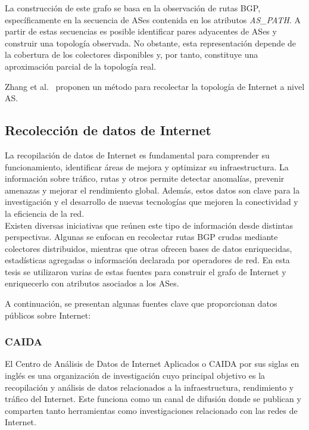 La construcción de este grafo se basa en la observación de rutas BGP, específicamente en la secuencia de ASes contenida en los atributos \textit{AS\_PATH}. A partir de estas secuencias es posible identificar pares adyacentes de ASes y construir una topología observada. No obstante, esta representación depende de la cobertura de los colectores disponibles y, por tanto, constituye una aproximación parcial de la topología real.


Zhang et al.~\cite{AS-topology-2004} proponen un método para recolectar la topología de Internet a nivel AS.





\subsection{Recolección de datos de Internet} \label{sec:anexo_recoleccion_datos_internet}



La recopilación de datos de Internet es fundamental para comprender su funcionamiento, identificar 
áreas de mejora y optimizar su infraestructura. La información sobre tráfico, rutas y otros permite 
detectar anomalías, prevenir amenazas y mejorar el rendimiento global. Además, estos datos son clave 
para la investigación y el desarrollo de nuevas tecnologías que mejoren la conectividad y la eficiencia de la red.\\


Existen diversas iniciativas que reúnen este tipo de información desde distintas perspectivas. Algunas 
se enfocan en recolectar rutas BGP crudas mediante colectores distribuidos, mientras que otras ofrecen 
bases de datos enriquecidas, estadísticas agregadas o información declarada por operadores de red. 
En esta tesis se utilizaron varias de estas fuentes para construir el grafo de Internet y enriquecerlo 
con atributos asociados a los ASes.

A continuación, se presentan algunas fuentes clave que proporcionan datos públicos sobre Internet:\\


\subsubsection{CAIDA} \label{sec:anexo_caida} 


El Centro de Análisis de Datos de Internet Aplicados o CAIDA por sus siglas en inglés \cite{CAIDA} es una 
organización de investigación cuyo principal objetivo es la recopilación y análisis de datos relacionados 
a la infraestructura, rendimiento y tráfico del Internet. Este funciona como un canal de difusión donde se 
publican y comparten tanto herramientas como investigaciones relacionado con las redes de Internet.\\

